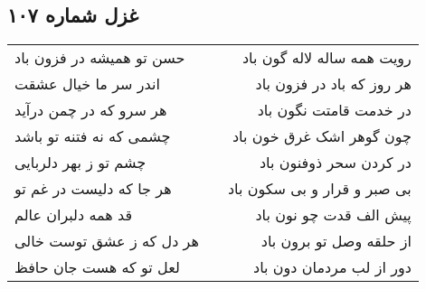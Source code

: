 \begin{center}
\section*{غزل شماره ۱۰۷}
\label{sec:sh107}
\begin{longtable}{l p{0.5cm} r}
حسن تو همیشه در فزون باد
&&
رویت همه ساله لاله گون باد
\\
اندر سر ما خیال عشقت
&&
هر روز که باد در فزون باد
\\
هر سرو که در چمن درآید
&&
در خدمت قامتت نگون باد
\\
چشمی که نه فتنه تو باشد
&&
چون گوهر اشک غرق خون باد
\\
چشم تو ز بهر دلربایی
&&
در کردن سحر ذوفنون باد
\\
هر جا که دلیست در غم تو
&&
بی صبر و قرار و بی سکون باد
\\
قد همه دلبران عالم
&&
پیش الف قدت چو نون باد
\\
هر دل که ز عشق توست خالی
&&
از حلقه وصل تو برون باد
\\
لعل تو که هست جان حافظ
&&
دور از لب مردمان دون باد
\\
\end{longtable}
\end{center}
